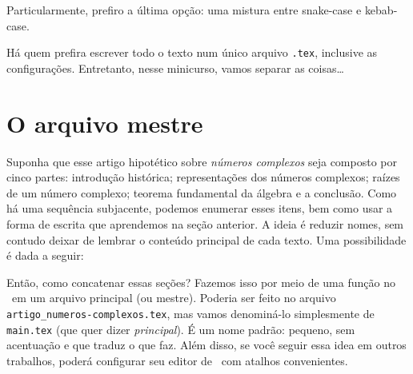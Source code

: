 
Particularmente, prefiro a última opção: uma mistura entre \textsf{snake-case} 
e \textsf{kebab-case}. 

Há quem prefira escrever todo o texto num único arquivo \texttt{.tex}, 
inclusive as configurações. 
Entretanto, nesse minicurso, vamos separar as coisas\ldots 

\section{O arquivo mestre} %

Suponha que esse artigo hipotético sobre \textit{números complexos} seja 
composto por cinco partes: 
introdução histórica; 
representações dos números complexos; 
raízes de um número complexo; 
teorema fundamental da álgebra e a 
conclusão. 
Como há uma sequência subjacente, podemos enumerar esses itens, bem como usar 
a forma de escrita que aprendemos na seção anterior. 
A ideia é reduzir nomes, sem contudo deixar de lembrar o conteúdo principal de 
cada texto. 
Uma possibilidade é dada a seguir:


Então, como concatenar essas seções?
Fazemos isso por meio de uma função no \LaTeXX\ em um arquivo principal (ou mestre). 
Poderia ser feito no arquivo \texttt{artigo\_numeros-complexos.tex}, mas vamos 
denominá-lo simplesmente de \texttt{main.tex} (que quer dizer \textit{principal}). 
É um nome padrão: pequeno, sem acentuação e que traduz o que faz. 
Além disso, se você seguir essa idea em outros trabalhos, poderá configurar seu 
editor de \LaTeXX\ com atalhos convenientes. 

